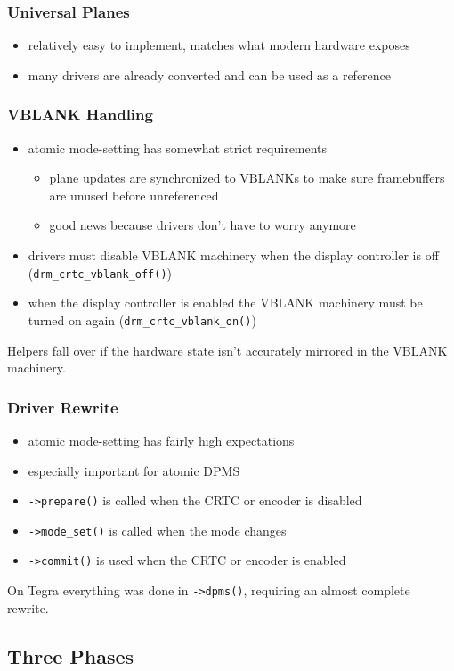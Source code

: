 \documentclass[t]{beamer}
\begin{document}
\begin{frame}
	\frametitle{Universal Planes}
	\begin{itemize}
		\item relatively easy to implement, matches what modern hardware
			exposes
		\item many drivers are already converted and can be used as a
			reference
	\end{itemize}
\end{frame}

\begin{frame}
	\frametitle{VBLANK Handling}
	\begin{itemize}
		\item atomic mode-setting has somewhat strict requirements
			\begin{itemize}
				\item plane updates are synchronized to VBLANKs to make sure
					framebuffers are unused before unreferenced
				\item good news because drivers don't have to worry anymore
			\end{itemize}
		\item drivers must disable VBLANK machinery when the display
			controller is off ({\tt drm\_crtc\_vblank\_off()})
		\item when the display controller is enabled the VBLANK machinery must
			be turned on again ({\tt drm\_crtc\_vblank\_on()})
	\end{itemize}
	Helpers fall over if the hardware state isn't accurately mirrored in the
	VBLANK machinery.
\end{frame}

\begin{frame}
	\frametitle{Driver Rewrite}
	\begin{itemize}
		\item atomic mode-setting has fairly high expectations
		\item especially important for atomic DPMS
		\item {\tt ->prepare()} is called when the CRTC or encoder is disabled
		\item {\tt ->mode\_set()} is called when the mode changes
		\item {\tt ->commit()} is used when the CRTC or encoder is enabled
	\end{itemize}
	On Tegra everything was done in {\tt ->dpms()}, requiring an almost
	complete rewrite.
\end{frame}

\subsection{Three Phases}
\end{document}
